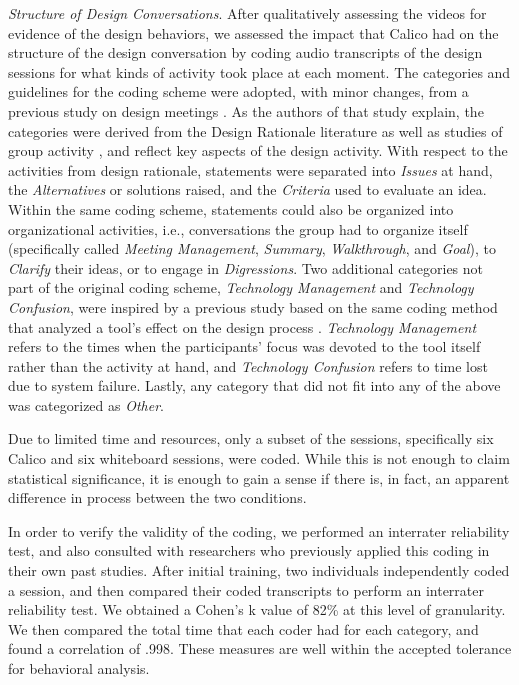    \emph{Structure of Design Conversations}. After qualitatively assessing the videos for evidence of the design behaviors, we assessed the impact that Calico had on the structure of the design conversation by coding audio transcripts of the design sessions for what kinds of activity took place at each moment. The categories and guidelines for the coding scheme were adopted, with minor changes, from a previous study on design meetings \citep{Olson}. As the authors of that study explain, the categories were derived from the Design Rationale literature \citep{Moran} as well as studies of group activity \citep{PUTNAM}, and reflect key aspects of the design activity. With respect to the activities from design rationale, statements were separated into \emph{Issues} at hand, the \emph{Alternatives} or solutions raised, and the \emph{Criteria} used to evaluate an idea. Within the same coding scheme, statements could also be organized into organizational activities, i.e., conversations the group had to organize itself (specifically called \emph{Meeting Management}, \emph{Summary}, \emph{Walkthrough}, and \emph{Goal}), to \emph{Clarify} their ideas, or to engage in \emph{Digressions}. Two additional categories not part of the original coding scheme, \emph{Technology Management} and \emph{Technology Confusion}, were inspired by a previous study based on the same coding method that analyzed a tool's effect on the design process \citep{Olsonb}. \emph{Technology Management} refers to the times when the participants' focus was devoted to the tool itself rather than the activity at hand, and \emph{Technology Confusion} refers to time lost due to system failure. Lastly, any category that did not fit into any of the above was categorized as \emph{Other}. 

Due to limited time and resources, only a subset of the sessions, specifically six Calico and six whiteboard sessions, were coded. While this is not enough to claim statistical significance, it is enough to gain a sense if there is, in fact, an apparent difference in process between the two conditions.

In order to verify the validity of the coding, we performed an interrater reliability test, and also consulted with researchers who previously applied this coding in their own past studies. After initial training, two individuals independently coded a session, and then compared their coded transcripts to perform an interrater reliability test. We obtained a Cohen's k value of 82\% at this level of granularity. We then compared the total time that each coder had for each category, and found a correlation of .998. These measures are well within the accepted tolerance for behavioral analysis.

